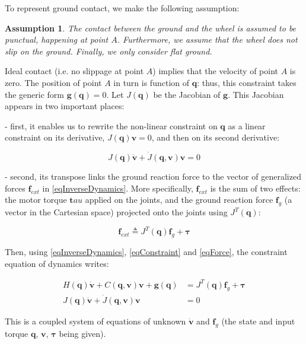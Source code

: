 \documentclass[a4paper,11pt]{article}
\newtheorem{assumption}{Assumption}
\begin{document}
To represent ground contact, we make the following assumption:

\begin{assumption}
	The contact between the ground and the wheel is assumed to be punctual, happening at point $A$. Furthermore, we assume that the wheel does not slip on the ground. Finally, we only consider flat ground.
\end{assumption}

Ideal contact (i.e. no slippage at point $A$) implies that the velocity of point $A$ is zero. The position of point $A$ in turn is function of $\bm q$: thus, this constraint takes the generic form $\bm g(\bm q) = 0$. Let $J(\bm q)$ be the Jacobian of $\bm g$. This Jacobian appears in two important places:

 - first, it enables us to rewrite the non-linear constraint on $\bm q$ as a linear constraint on its derivative, $J(\bm q) \bm v = 0$, and then on its second derivative:
 
 \begin{equation}
 J(\bm q) \dot{\bm v} + \dot{J}(\bm q, \bm v) \bm v = 0
 \label{eqConstraint}
 \end{equation} 
 
 
 - second, its transpose links the ground reaction force to the vector of generalized forces $\bm f_{ext}$ in \eqref{eqInverseDynamics}. More specifically, $\bm f_{ext}$ is the sum of two effects: the motor torque $\bm tau$ applied on the joints, and the ground reaction force $\bm f_g$ (a vector in the Cartesian space) projected onto the joints using $J^T(\bm q)$:
 
 \begin{equation}
 \bm f_{ext} \triangleq J^T(\bm q) \bm f_g + \bm \tau
 \label{eqForce}
 \end{equation}
 
 
Then, using \eqref{eqInverseDynamics}, \eqref{eqConstraint} and \eqref{eqForce}, the constraint equation of dynamics writes:

\begin{equation}
\begin{aligned}
H(\bm q) \dot{\bm v} + C(\bm q, \bm v) \bm v + \bm g(\bm q) &= J^T(\bm q) \bm f_g + \bm \tau \\
J(\bm q) \dot{\bm v} + \dot{J}(\bm q, \bm v) \bm v &= 0
\end{aligned}
\label{eqInverseDynamicsConstaint}
\end{equation} 

This is a coupled system of equations of unknown $\dot{\bm v}$ and $\bm f_g$ (the state and input torque $\bm q$, $\bm v$, $\bm \tau$ being given). 
\end{document}
